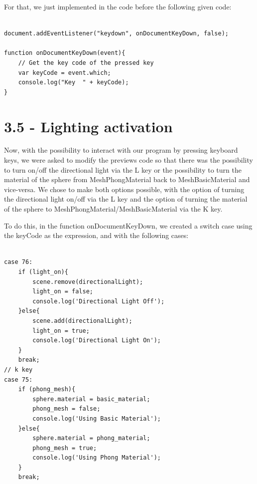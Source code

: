\documentclass[12pt]{article}
\begin{document}
For that, we just implemented in the code before the following given code:
\begin{lstlisting}

document.addEventListener("keydown", onDocumentKeyDown, false);

function onDocumentKeyDown(event){ 
    // Get the key code of the pressed key 
    var keyCode = event.which;
    console.log("Key  " + keyCode);
}

\end{lstlisting}

\section*{3.5 - Lighting activation}
\label{ex_35}

Now, with the possibility to interact with our program by pressing keyboard keys, we were asked to modify the previews code so that there was the possibility to turn on/off the directional light via the L key or the possibility to turn the material of the sphere from MeshPhongMaterial back to MeshBasicMaterial and vice-versa. We chose to make both options possible, with the option of turning the directional light on/off via the L key and the option of turning the material of the sphere to MeshPhongMaterial/MeshBasicMaterial via the K key.\par

To do this, in the function onDocumentKeyDown, we created a switch case using the keyCode as the expression, and with the following cases:
\begin{lstlisting}

case 76:
    if (light_on){
        scene.remove(directionalLight);
        light_on = false;
        console.log('Directional Light Off');
    }else{
        scene.add(directionalLight);
        light_on = true;
        console.log('Directional Light On');
    }
    break;
// k key
case 75:
    if (phong_mesh){
        sphere.material = basic_material;
        phong_mesh = false;
        console.log('Using Basic Material');
    }else{
        sphere.material = phong_material;
        phong_mesh = true;
        console.log('Using Phong Material');
    }
    break;

\end{lstlisting}

\noindent
\end{document}
